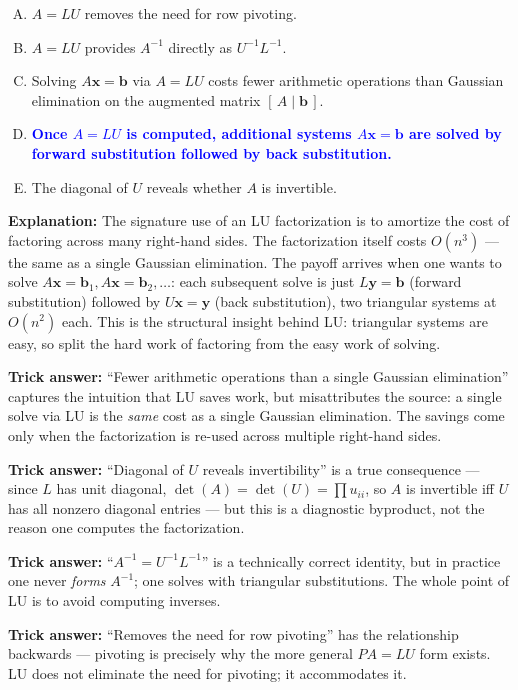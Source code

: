 \documentclass[12pt]{amsart}
\begin{document}
\begin{enumerate}[(A)]
\item $A = LU$ removes the need for row pivoting.
\item $A = LU$ provides $A^{-1}$ directly as $U^{-1}L^{-1}$.
\item Solving $A\mathbf{x} = \mathbf{b}$ via $A = LU$ costs fewer arithmetic operations than Gaussian elimination on the augmented matrix $[\,A \mid \mathbf{b}\,]$.
\item \textcolor{blue}{\textbf{Once $A = LU$ is computed, additional systems $A\mathbf{x} = \mathbf{b}$ are solved by forward substitution followed by back substitution.}}
\item The diagonal of $U$ reveals whether $A$ is invertible.
\end{enumerate}

\textbf{Explanation:}
The signature use of an LU factorization is to amortize the cost of factoring
across many right-hand sides. The factorization itself costs $O(n^3)$ ---
the same as a single Gaussian elimination. The payoff arrives when one wants
to solve $A\mathbf{x} = \mathbf{b}_1, A\mathbf{x} = \mathbf{b}_2, \ldots$:
each subsequent solve is just $L\mathbf{y} = \mathbf{b}$ (forward substitution)
followed by $U\mathbf{x} = \mathbf{y}$ (back substitution), two triangular
systems at $O(n^2)$ each. This is the structural insight behind LU:
triangular systems are easy, so split the hard work of factoring from the
easy work of solving.

\textbf{Trick answer:}
``Fewer arithmetic operations than a single Gaussian elimination'' captures
the intuition that LU saves work, but misattributes the source: a single
solve via LU is the \emph{same} cost as a single Gaussian elimination.
The savings come only when the factorization is re-used across multiple
right-hand sides.

\textbf{Trick answer:}
``Diagonal of $U$ reveals invertibility'' is a true consequence --- since
$L$ has unit diagonal, $\det(A) = \det(U) = \prod u_{ii}$, so $A$ is invertible
iff $U$ has all nonzero diagonal entries --- but this is a diagnostic
byproduct, not the reason one computes the factorization.

\textbf{Trick answer:}
``$A^{-1} = U^{-1}L^{-1}$'' is a technically correct identity, but in practice
one never \emph{forms} $A^{-1}$; one solves with triangular substitutions.
The whole point of LU is to avoid computing inverses.

\textbf{Trick answer:}
``Removes the need for row pivoting'' has the relationship backwards ---
pivoting is precisely why the more general $PA = LU$ form exists. LU does
not eliminate the need for pivoting; it accommodates it.
\end{document}
